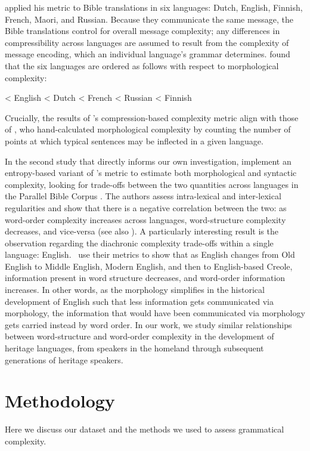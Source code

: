 \documentclass[output=paper]{langscibook}
\begin{document}
\citeauthor{juola1998measuring} applied his metric to Bible translations in six languages: Dutch, English, Finnish, French, Maori, and Russian. Because they communicate the same message, the Bible translations control for overall message complexity; any differences in compressibility across languages are assumed to result from the complexity of message encoding, which an individual language's grammar determines. \citeauthor{juola1998measuring} found that the six languages are ordered as follows with respect to morphological complexity: 

 <  {English} <  {Dutch} <  {French} <  {Russian} <  {Finnish}\z

Crucially, the results of \citeauthor{juola1998measuring}'s compression-based complexity metric align with those of \citet{nichols1992}, who hand-calculated morphological complexity by counting the number of points at which typical sentences may be inflected in a given language.

In the second study that directly informs our own investigation, \citet{koplenig2017statistical} implement an entropy-based variant of \citeauthor{juola1998measuring}'s metric to estimate both morphological and syntactic complexity, looking for trade-offs between the two quantities across languages in the Parallel Bible Corpus \citep{mayer2014creating}. The authors assess intra-lexical and inter-lexical regularities and show that there is a negative correlation between the two: as word-order complexity increases across languages, word-structure complexity decreases, and vice-versa (see also \citealp{juola2008assessing}). A particularly interesting result is the observation regarding the diachronic complexity trade-offs within a single language: English. \citeauthor{koplenig2017statistical}~use their metrics to show that as English changes from Old English to Middle English, Modern English, and then to English-based Creole, information present in word structure decreases, and word-order information increases. In other words, as the morphology simplifies in the historical development of English such that less information gets communicated via morphology, the information that would have been communicated via morphology gets carried instead by word order. In our work, we study similar relationships between word-structure and word-order complexity in the development of heritage languages, from speakers in the homeland through subsequent generations of heritage speakers.



\section{Methodology} \label{method}
Here we discuss our dataset and the methods we used to assess grammatical complexity.
\end{document}
